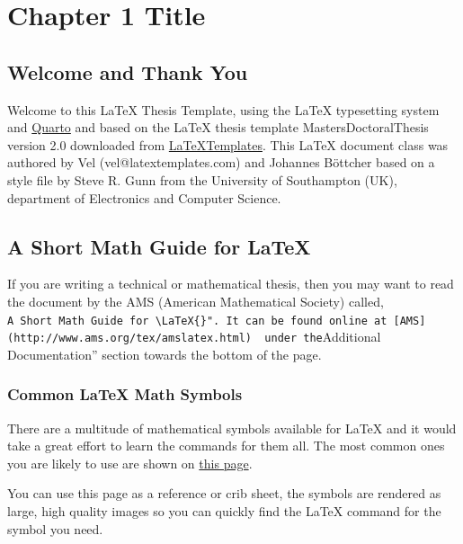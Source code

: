 \documentclass[
  letterpaper,
  11pt,
  english,
  singlespacing,
  headsepline]{MastersDoctoralThesis}
\begin{document}

\chapter{Chapter 1 Title}\label{sec-Chapter1}

\section{Welcome and Thank You}\label{welcome-and-thank-you}

Welcome to this \LaTeX{} Thesis Template, using the \LaTeX{} typesetting
system and \href{quarto.org}{Quarto} and based on the \LaTeX{} thesis
template MastersDoctoralThesis version 2.0 downloaded from
\href{http://www.LaTeXTemplates.com}{LaTeXTemplates}. This LaTeX
document class was authored by Vel (vel@latextemplates.com) and Johannes
Böttcher based on a style file by Steve R. Gunn from the University of
Southampton (UK), department of Electronics and Computer Science.

\section{\texorpdfstring{A Short Math Guide for
\LaTeX{}}{A Short Math Guide for }}\label{a-short-math-guide-for}

If you are writing a technical or mathematical thesis, then you may want
to read the document by the AMS (American Mathematical Society) called,
\texttt{A\ Short\ Math\ Guide\ for\ \textbackslash{}LaTeX\{\}".\ It\ can\ be\ found\ online\ at\ {[}AMS{]}(http://www.ams.org/tex/amslatex.html)\ \ under\ the}Additional
Documentation'' section towards the bottom of the page.

\subsection{\texorpdfstring{Common \LaTeX{} Math
Symbols}{Common  Math Symbols}}\label{common-math-symbols}

There are a multitude of mathematical symbols available for \LaTeX{} and
it would take a great effort to learn the commands for them all. The
most common ones you are likely to use are shown on
\href{http://www.sunilpatel.co.uk/latex-type/latex-math-symbols/}{this
page}.

You can use this page as a reference or crib sheet, the symbols are
rendered as large, high quality images so you can quickly find the
\LaTeX{} command for the symbol you need.
\end{document}
